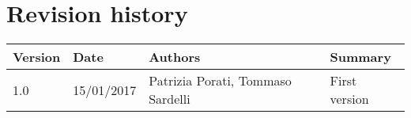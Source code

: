 \section{Revision history}
\begin{tabular}{|l|l|l|l|}
	\hline
	\textbf{Version}	& \textbf{Date}	& \textbf{Authors}	& \textbf{Summary}\\
	\hline
	1.0 	& 15/01/2017 	& Patrizia Porati, Tommaso Sardelli 	& First version\\
	\hline
\end{tabular}